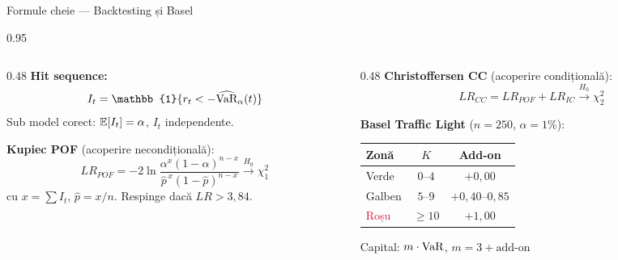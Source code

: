 \documentclass[9pt, aspectratio=169, t]{beamer}
\begin{document}
\begin{frame}[shrink=10]{Formule cheie --- Backtesting și Basel}
    \begin{cminipage}{0.95\textwidth}
    \begin{columns}[T]
        \begin{column}{0.48\textwidth}
            \textbf{Hit sequence:}
            \[
            I_t = \mathbb{1}\{r_t < -\widehat{\VaR}_\alpha(t)\}
            \]
            Sub model corect: $\mathbb{E}[I_t] = \alpha$, $I_t$ independente.

            \vspace{0.15cm}
            \textbf{Kupiec POF} (acoperire necondițională):
            \[
            LR_{POF} = -2\ln\frac{\alpha^x (1-\alpha)^{n-x}}{\hat p^{\,x}(1-\hat p)^{n-x}} \xrightarrow{H_0} \chi^2_1
            \]
            cu $x = \sum I_t$, $\hat p = x/n$. Respinge dacă $LR > 3{,}84$.
        \end{column}
        \begin{column}{0.48\textwidth}
            \textbf{Christoffersen CC} (acoperire condițională):
            \[
            LR_{CC} = LR_{POF} + LR_{IC} \xrightarrow{H_0} \chi^2_2
            \]

            \vspace{0.15cm}
            \textbf{Basel Traffic Light} ($n=250$, $\alpha=1\%$):
            \begin{center}
            \footnotesize
            \begin{tabular}{lcc}
            \toprule
            \textbf{Zonă} & \textbf{$K$} & \textbf{Add-on} \\
            \midrule
            \textcolor{Forest}{Verde}   & $0$--$4$ & $+0{,}00$ \\
            \textcolor{Amber}{Galben}   & $5$--$9$ & $+0{,}40$--$0{,}85$ \\
            \textcolor{Crimson}{Roșu}   & $\geq 10$ & $+1{,}00$ \\
            \bottomrule
            \end{tabular}
            \end{center}
            Capital: $m \cdot \text{VaR}$, $m = 3 + \text{add-on}$
        \end{column}
    \end{columns}
    \end{cminipage}
\end{frame}
\end{document}
